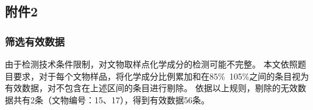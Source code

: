 
\subsection{附件2} %
\label{sub:附件2}

\subsubsection{筛选有效数据} %
\label{ssub:筛选有效数据}


由于检测技术条件限制，对文物取样点化学成分的检测可能不完整。
本文依照题目要求，对于每个文物样品，将化学成分比例累加和在85\%~105\%之间的条目视为有效数据，对不包含在上述区间的条目进行剔除。
依据以上规则，剔除的无效数据共有2条（文物编号：15、17），得到有效数据56条。



